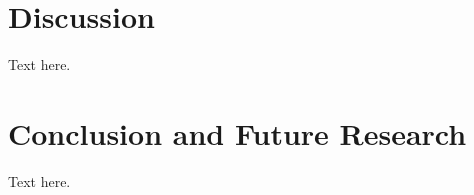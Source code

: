 \documentclass{article}
\begin{document}
\section{Discussion}

Text here.

\section{Conclusion and Future Research}

Text here.




\end{document}
